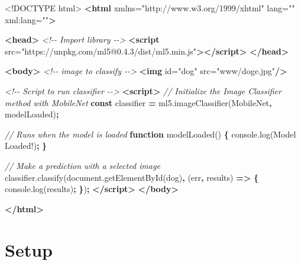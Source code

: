 \documentclass[
]{krantz}
\makeatletter
\newenvironment{Shaded}{\begin{snugshade}}{\end{snugshade}}
\newcommand{\AttributeTok}[1]{\textcolor[rgb]{0.61,0.61,0.61}{#1}}
\newcommand{\CommentTok}[1]{\textcolor[rgb]{0.37,0.37,0.37}{\textit{#1}}}
\newcommand{\DataTypeTok}[1]{\textcolor[rgb]{0.27,0.27,0.27}{#1}}
\newcommand{\KeywordTok}[1]{\textcolor[rgb]{0.27,0.27,0.27}{\textbf{#1}}}
\newcommand{\NormalTok}[1]{#1}
\newcommand{\OperatorTok}[1]{\textcolor[rgb]{0.43,0.43,0.43}{\textbf{#1}}}
\newcommand{\OtherTok}[1]{\textcolor[rgb]{0.37,0.37,0.37}{#1}}
\newcommand{\StringTok}[1]{\textcolor[rgb]{0.5,0.5,0.5}{#1}}
\newcommand{\VariableTok}[1]{\textcolor[rgb]{0,0,0}{#1}}
\newenvironment{kframe}{%
\medskip{}
\setlength{\fboxsep}{.8em}
 \def\at@end@of@kframe{}%
 \ifinner\ifhmode%
  \def\at@end@of@kframe{\end{minipage}}%
  \begin{minipage}{\columnwidth}%
 \fi\fi%
 \def\FrameCommand##1{\hskip\@totalleftmargin \hskip-\fboxsep
 \colorbox{shadecolor}{##1}\hskip-\fboxsep
     \hskip-\linewidth \hskip-\@totalleftmargin \hskip\columnwidth}%
 \MakeFramed {\advance\hsize-\width
   \@totalleftmargin\z@ \linewidth\hsize
   \@setminipage}}%
 {\par\unskip\endMakeFramed%
 \at@end@of@kframe}
\renewenvironment{Shaded}{\begin{kframe}}{\end{kframe}}
\makeatother
\begin{document}
\begin{Shaded}
\begin{Highlighting}[]
\DataTypeTok{<!DOCTYPE }\NormalTok{html}\DataTypeTok{>}
\KeywordTok{<html}\OtherTok{ xmlns=}\StringTok{"http://www.w3.org/1999/xhtml"}\OtherTok{ lang=}\StringTok{""}\OtherTok{ xml:lang=}\StringTok{""}\KeywordTok{>}

\KeywordTok{<head>}
  \CommentTok{<!{-}{-} Import library {-}{-}>}
  \KeywordTok{<script}\OtherTok{ src=}\StringTok{"https://unpkg.com/ml5@0.4.3/dist/ml5.min.js"}\KeywordTok{></script>}
\KeywordTok{</head>}

\KeywordTok{<body>}
  \CommentTok{<!{-}{-} image to classify {-}{-}>}
  \KeywordTok{<img}\OtherTok{ id=}\StringTok{"dog"}\OtherTok{ src=}\StringTok{"www/doge.jpg"}\KeywordTok{/>}

  \CommentTok{<!{-}{-} Script to run classifier {-}{-}>}
  \KeywordTok{<script>}
    \CommentTok{// Initialize the Image Classifier method with MobileNet}
    \KeywordTok{const}\NormalTok{ classifier }\OperatorTok{=} \VariableTok{ml5}\NormalTok{.}\AttributeTok{imageClassifier}\NormalTok{(}\StringTok{\textquotesingle{}MobileNet\textquotesingle{}}\OperatorTok{,}\NormalTok{ modelLoaded)}\OperatorTok{;}

    \CommentTok{// Runs when the model is loaded}
    \KeywordTok{function} \AttributeTok{modelLoaded}\NormalTok{() }\OperatorTok{\{}
      \VariableTok{console}\NormalTok{.}\AttributeTok{log}\NormalTok{(}\StringTok{\textquotesingle{}Model Loaded!\textquotesingle{}}\NormalTok{)}\OperatorTok{;}
    \OperatorTok{\}}

    \CommentTok{// Make a prediction with a selected image}
    \VariableTok{classifier}\NormalTok{.}\AttributeTok{classify}\NormalTok{(}\VariableTok{document}\NormalTok{.}\AttributeTok{getElementById}\NormalTok{(}\StringTok{\textquotesingle{}dog\textquotesingle{}}\NormalTok{)}\OperatorTok{,}\NormalTok{ (err}\OperatorTok{,}\NormalTok{ results) }\KeywordTok{=>} \OperatorTok{\{}
      \VariableTok{console}\NormalTok{.}\AttributeTok{log}\NormalTok{(results)}\OperatorTok{;}
    \OperatorTok{\}}\NormalTok{)}\OperatorTok{;}
  \KeywordTok{</script>}
\KeywordTok{</body>}

\KeywordTok{</html>}
\end{Highlighting}
\end{Shaded}

\hypertarget{setup}{%
\section{Setup}\label{setup}}
\end{document}
